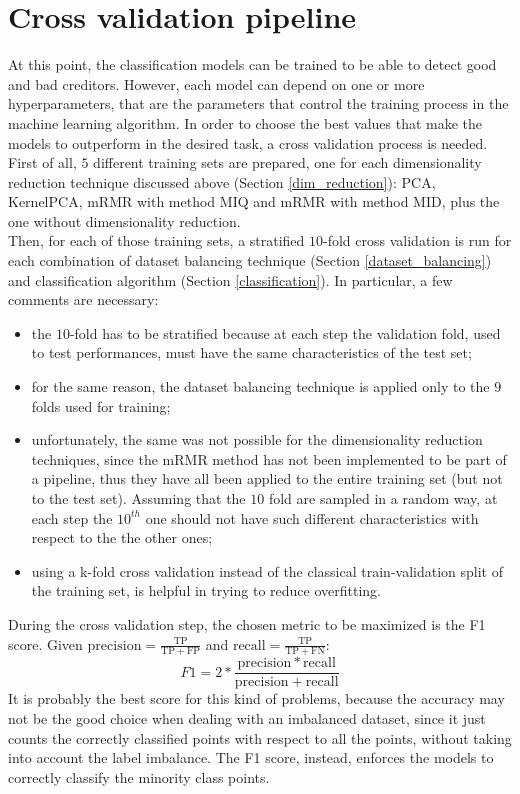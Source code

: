 \documentclass[letterpaper]{article}
\begin{document}
	\section{Cross validation pipeline}
	At this point, the classification models can be trained to be able to detect good and bad creditors. However, each model can depend on one or more hyperparameters, that are the parameters that control the training process in the machine learning algorithm. In order to choose the best values that make the models to outperform in the desired task, a cross validation process is needed. \\
	First of all, $5$ different training sets are prepared, one for each dimensionality reduction technique discussed above (Section \ref{dim_reduction}): PCA, KernelPCA, mRMR with method MIQ and mRMR with method MID, plus the one without dimensionality reduction.\\
	Then, for each of those training sets, a stratified $10$-fold cross validation is run for each combination of dataset balancing technique (Section \ref{dataset_balancing}) and classification algorithm (Section \ref{classification}). 
	In particular, a few comments are necessary:
	\begin{itemize}
		\item the $10$-fold has to be stratified because at each step the validation fold, used to test performances, must have the same characteristics of the test set;
		\item for the same reason, the dataset balancing technique is applied only to the $9$ folds used for training;
		\item unfortunately, the same was not possible for the dimensionality reduction techniques, since the mRMR method has not been implemented to be part of a pipeline, thus they have all been applied to the entire training set (but not to the test set). Assuming that the $10$ fold are sampled in a random way, at each step the $10^{th}$ one should not have such different characteristics with respect to the the other ones;
		\item using a k-fold cross validation instead of the classical train-validation split of the training set, is helpful in trying to reduce overfitting.
	\end{itemize}
	During the cross validation step, the chosen metric to be maximized is the F1 score. Given $\mathrm{precision} = \frac{\mathrm{TP}}{\mathrm{TP}+\mathrm{FP}}$ and $\mathrm{recall} =  \frac{\mathrm{TP}}{\mathrm{TP}+\mathrm{FN}}$:
	\begin{equation}\label{f1}	
		F1 = 2 * \frac{\mathrm{precision}*\mathrm{recall}}{\mathrm{precis	ion}+\mathrm{recall}}
	\end{equation}
	It is probably the best score for this kind of problems, because the accuracy may not be the good choice when dealing with an imbalanced dataset, since it just counts the correctly classified points with respect to all the points, without taking into account the label imbalance. The F1 score, instead, enforces the models to correctly classify the minority class points.
\end{document}
